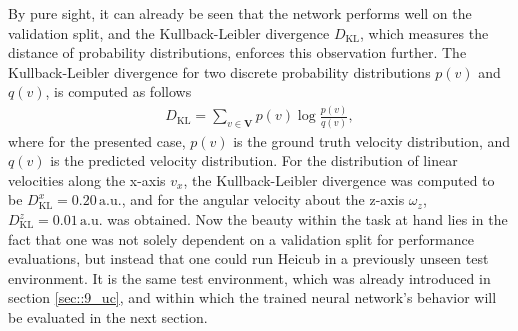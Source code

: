 By pure sight, it can already be seen that the network performs well on the validation split, and the Kullback-Leibler divergence $D_\text{KL}$, which measures the distance of probability distributions, enforces this observation further. The Kullback-Leibler divergence for two discrete probability distributions $p(v)$ and $q(v)$, is computed as follows
\begin{align}
	D_\text{KL} = \sum_{v\in \bm{V}}p(v)\log\frac{p(v)}{q(v)},
\end{align}
where for the presented case, $p(v)$ is the ground truth velocity distribution, and $q(v)$ is the predicted velocity distribution. For the distribution of linear velocities along the x-axis $v_x$, the Kullback-Leibler divergence was computed to be $D^x_\text{KL}=0.20\,\text{a.u.}$, and for the angular velocity about the z-axis $\omega_z$, $D^z_\text{KL}=0.01\,\text{a.u.}$ was obtained. Now the beauty within the task at hand lies in the fact that one was not solely dependent on a validation split for performance evaluations, but instead that one could run Heicub in a previously unseen test environment. It is the same test environment, which was already introduced in section \ref{sec::9_uc}, and within which the trained neural network's behavior will be evaluated in the next section.

\FloatBarrier
